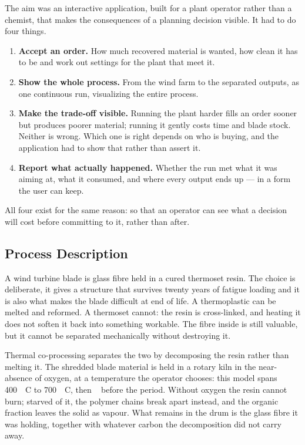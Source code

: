 The aim was an interactive application, built for a plant operator rather than a chemist, that makes the consequences of a planning decision visible. It had to do four things.
\begin{enumerate}
  \item \textbf{Accept an order.} How much recovered material is wanted, how clean it has to be and work out settings for the plant that meet it.

  \item \textbf{Show the whole process.} From the wind farm to the separated outputs, as one continuous run, visualizing the entire process.

  \item \textbf{Make the trade-off visible.} Running the plant harder fills an order sooner but produces poorer material; running it gently costs time and blade stock. Neither is wrong. Which one is right depends on who is buying, and the application had to show that rather than assert it.

  \item \textbf{Report what actually happened.} Whether the run met what it was aiming at, what it consumed, and where every output ends up --- in a form the user can keep.
\end{enumerate}

All four exist for the same reason: so that an operator can see what a
decision will cost before committing to it, rather than after.

\subsection{Process Description}

A wind turbine blade is glass fibre held in a cured thermoset resin. The
choice is deliberate, it gives a structure that survives twenty years of fatigue loading and it is also what makes the blade difficult at end of
life. A thermoplastic can be melted and reformed. A thermoset cannot: the
resin is cross-linked, and heating it does not soften it back into something workable. The fibre inside is still valuable, but it cannot be separated mechanically without destroying it.

Thermal co-processing separates the two by decomposing the resin rather than melting it. The shredded blade material is held in a rotary kiln in the near-absence of oxygen, at a temperature the operator chooses: this model spans \SI{400}{\textdegree C} to \SI{700}{\textdegree C}, then ~\cite{bladegas} before the period. Without oxygen the resin cannot burn; starved of it, the polymer chains break apart instead, and the organic fraction leaves the solid as vapour. What remains in the drum is the glass fibre it was holding, together with whatever carbon the decomposition did not carry away.

